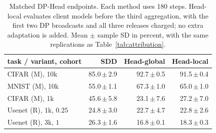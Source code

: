 \begin{table}[t]
\centering
\caption{Matched DP-Head endpoints. Each method uses 180 steps. Head-local evaluates client models before the third aggregation, with the first two DP broadcasts and all three releases charged; no extra adaptation is added. Mean $\pm$ sample SD in percent, with the same replications as Table~\ref{tab:attribution}.}
\label{tab:head-local}
\small\setlength{\tabcolsep}{3pt}
\begin{tabular}{@{}lrrr@{}}\toprule
task / variant, cohort & SDD & Head-global & Head-local \\\midrule
CIFAR (M), 10k & 85.0\,$\pm$\,2.9 & 92.7\,$\pm$\,0.5 & 91.5\,$\pm$\,0.4 \\
MNIST (M), 10k & 55.0\,$\pm$\,1.1 & 67.3\,$\pm$\,1.0 & 65.0\,$\pm$\,1.0 \\
CIFAR (M), 1k & 45.6\,$\pm$\,5.8 & 23.1\,$\pm$\,7.6 & 27.2\,$\pm$\,7.0 \\
Usenet (R), 1k, $0.25$ & 24.8\,$\pm$\,3.0 & 22.7\,$\pm$\,4.7 & 22.8\,$\pm$\,2.6 \\
Usenet (R), 3k, $1$ & 26.3\,$\pm$\,1.6 & 16.8\,$\pm$\,0.1 & 18.3\,$\pm$\,0.3 \\
\bottomrule\end{tabular}
\end{table}
